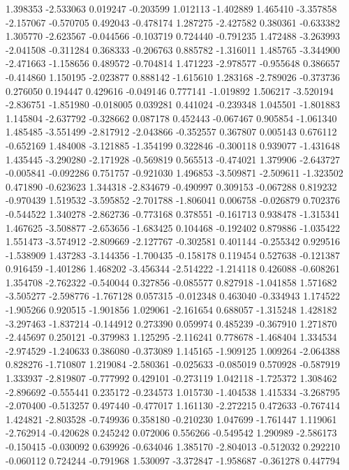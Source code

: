 1.398353
-2.533063
0.019247
-0.203599
1.012113
-1.402889
1.465410
-3.357858
-2.157067
-0.570705
0.492043
-0.478174
1.287275
-2.427582
0.380361
-0.633382
1.305770
-2.623567
-0.044566
-0.103719
0.724440
-0.791235
1.472488
-3.263993
-2.041508
-0.311284
0.368333
-0.206763
0.885782
-1.316011
1.485765
-3.344900
-2.471663
-1.158656
0.489572
-0.704814
1.471223
-2.978577
-0.955648
0.386657
-0.414860
1.150195
-2.023877
0.888142
-1.615610
1.283168
-2.789026
-0.373736
0.276050
0.194447
0.429616
-0.049146
0.777141
-1.019892
1.506217
-3.520194
-2.836751
-1.851980
-0.018005
0.039281
0.441024
-0.239348
1.045501
-1.801883
1.145804
-2.637792
-0.328662
0.087178
0.452443
-0.067467
0.905854
-1.061340
1.485485
-3.551499
-2.817912
-2.043866
-0.352557
0.367807
0.005143
0.676112
-0.652169
1.484008
-3.121885
-1.354199
0.322846
-0.300118
0.939077
-1.431648
1.435445
-3.290280
-2.171928
-0.569819
0.565513
-0.474021
1.379906
-2.643727
-0.005841
-0.092286
0.751757
-0.921030
1.496853
-3.509871
-2.509611
-1.323502
0.471890
-0.623623
1.344318
-2.834679
-0.490997
0.309153
-0.067288
0.819232
-0.970439
1.519532
-3.595852
-2.701788
-1.806041
0.006758
-0.026879
0.702376
-0.544522
1.340278
-2.862736
-0.773168
0.378551
-0.161713
0.938478
-1.315341
1.467625
-3.508877
-2.653656
-1.683425
0.104468
-0.192402
0.879886
-1.035422
1.551473
-3.574912
-2.809669
-2.127767
-0.302581
0.401144
-0.255342
0.929516
-1.538909
1.437283
-3.144356
-1.700435
-0.158178
0.119454
0.527638
-0.121387
0.916459
-1.401286
1.468202
-3.456344
-2.514222
-1.214118
0.426088
-0.608261
1.354708
-2.762322
-0.540044
0.327856
-0.085577
0.827918
-1.041858
1.571682
-3.505277
-2.598776
-1.767128
0.057315
-0.012348
0.463040
-0.334943
1.174522
-1.905266
0.920515
-1.901856
1.029061
-2.161654
0.688057
-1.315248
1.428182
-3.297463
-1.837214
-0.144912
0.273390
0.059974
0.485239
-0.367910
1.271870
-2.445697
0.250121
-0.379983
1.125295
-2.116241
0.778678
-1.468404
1.334534
-2.974529
-1.240633
0.386080
-0.373089
1.145165
-1.909125
1.009264
-2.064388
0.828276
-1.710807
1.219084
-2.580361
-0.025633
-0.085019
0.570928
-0.587919
1.333937
-2.819807
-0.777992
0.429101
-0.273119
1.042118
-1.725372
1.308462
-2.896692
-0.555441
0.235172
-0.234573
1.015730
-1.404538
1.415334
-3.268795
-2.070400
-0.513257
0.497440
-0.477017
1.161130
-2.272215
0.472633
-0.767414
1.424821
-2.803528
-0.749936
0.358180
-0.210230
1.047699
-1.761447
1.119061
-2.762914
-0.420628
0.245242
0.072006
0.556266
-0.549542
1.290989
-2.586173
-0.150415
-0.030092
0.639926
-0.634046
1.385170
-2.804013
-0.512032
0.292210
-0.060112
0.724244
-0.791968
1.530097
-3.372847
-1.958687
-0.361278
0.447794
